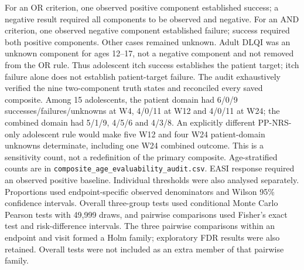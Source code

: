 \documentclass[10pt,a4paper]{article}
\begin{document}
For an OR criterion, one observed positive component established success; a negative result required all components to be observed and negative. For an AND criterion, one observed negative component established failure; success required both positive components. Other cases remained unknown. Adult DLQI was an unknown component for ages 12--17, not a negative component and not removed from the OR rule. Thus adolescent itch success establishes the patient target; itch failure alone does not establish patient-target failure. The audit exhaustively verified the nine two-component truth states and reconciled every saved composite. Among 15 adolescents, the patient domain had 6/0/9 successes/failures/unknowns at W4, 4/0/11 at W12 and 4/0/11 at W24; the combined domain had 5/1/9, 4/5/6 and 4/3/8. An explicitly different PP-NRS-only adolescent rule would make five W12 and four W24 patient-domain unknowns determinate, including one W24 combined outcome. This is a sensitivity count, not a redefinition of the primary composite. Age-stratified counts are in \texttt{composite\_age\_evaluability\_audit.csv}. EASI response required an observed positive baseline. Individual thresholds were also analysed separately. Proportions used endpoint-specific observed denominators and Wilson 95\% confidence intervals. Overall three-group tests used conditional Monte Carlo Pearson tests with 49,999 draws, and pairwise comparisons used Fisher's exact test and risk-difference intervals. The three pairwise comparisons within an endpoint and visit formed a Holm family; exploratory FDR results were also retained. Overall tests were not included as an extra member of that pairwise family.
\end{document}
